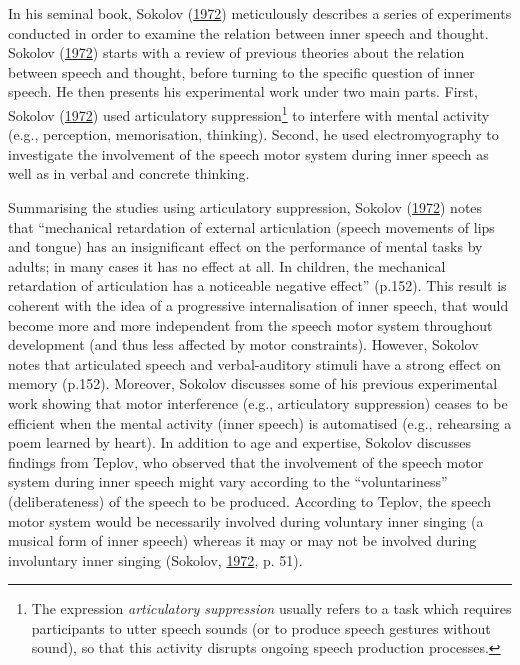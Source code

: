 \documentclass[a4paper,12pt,twoside,onecolumn,openright,final,oldfontcommands]{memoir}
\let\rmarkdownfootnote\footnote%
\def\footnote{\protect\rmarkdownfootnote}
\begin{document}
In his seminal book, Sokolov (\protect\hyperlink{ref-sokolov_inner_1972}{1972}) meticulously describes a series of experiments conducted in order to examine the relation between inner speech and thought. Sokolov (\protect\hyperlink{ref-sokolov_inner_1972}{1972}) starts with a review of previous theories about the relation between speech and thought, before turning to the specific question of inner speech. He then presents his experimental work under two main parts. First, Sokolov (\protect\hyperlink{ref-sokolov_inner_1972}{1972}) used articulatory suppression\footnote{The expression \emph{articulatory suppression} usually refers to a task which requires participants to utter speech sounds (or to produce speech gestures without sound), so that this activity disrupts ongoing speech production processes.} to interfere with mental activity (e.g., perception, memorisation, thinking). Second, he used electromyography to investigate the involvement of the speech motor system during inner speech as well as in verbal and concrete thinking.

Summarising the studies using articulatory suppression, Sokolov (\protect\hyperlink{ref-sokolov_inner_1972}{1972}) notes that \enquote{mechanical retardation of external articulation (speech movements of lips and tongue) has an insignificant effect on the performance of mental tasks by adults; in many cases it has no effect at all. In children, the mechanical retardation of articulation has a noticeable negative effect} (p.152). This result is coherent with the idea of a progressive internalisation of inner speech, that would become more and more independent from the speech motor system throughout development (and thus less affected by motor constraints). However, Sokolov notes that articulated speech and verbal-auditory stimuli have a strong effect on memory (p.152). Moreover, Sokolov discusses some of his previous experimental work showing that motor interference (e.g., articulatory suppression) ceases to be efficient when the mental activity (inner speech) is automatised (e.g., rehearsing a poem learned by heart). In addition to age and expertise, Sokolov discusses findings from Teplov, who observed that the involvement of the speech motor system during inner speech might vary according to the \enquote{voluntariness} (deliberateness) of the speech to be produced. According to Teplov, the speech motor system would be necessarily involved during voluntary inner singing (a musical form of inner speech) whereas it may or may not be involved during involuntary inner singing (Sokolov, \protect\hyperlink{ref-sokolov_inner_1972}{1972}, p. 51).
\end{document}

